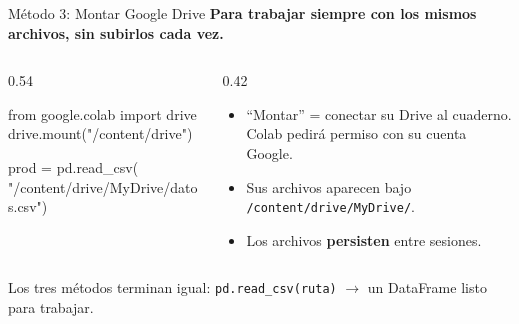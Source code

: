 \documentclass[aspectratio=169, 11pt]{beamer}
\begin{document}
\begin{frame}[fragile,shrink=12]{Método 3: Montar Google Drive}
  \vspace{-4pt}
  {\small\color{arcaDark}\bfseries
    Para trabajar siempre con los mismos archivos, sin subirlos cada vez.}

  \vspace{4pt}
  \begin{columns}[T]
    \begin{column}{0.54\textwidth}
      \begin{pyblock}
from google.colab import drive
drive.mount("/content/drive")

prod = pd.read_csv(
  "/content/drive/MyDrive/datos.csv")
      \end{pyblock}
    \end{column}

    \begin{column}{0.42\textwidth}
      {\scriptsize\color{textMuted}
      \begin{itemize}\setlength{\itemsep}{5pt}
        \item[{\color{arcaRed}\scriptsize\faArrowRight}]
          ``Montar'' = conectar su Drive al cuaderno.
          Colab pedirá permiso con su cuenta Google.
        \item[{\color{arcaRed}\scriptsize\faArrowRight}]
          Sus archivos aparecen bajo
          \texttt{/content/drive/MyDrive/}.
        \item[{\color{codeGreen}\scriptsize\faCheck}]
          Los archivos \textbf{persisten} entre sesiones.
      \end{itemize}
      }
    \end{column}
  \end{columns}

  \vspace{6pt}
  {\footnotesize\color{arcaDark}
    \faLightbulb[regular]\hspace{4pt}%
    Los tres métodos terminan igual: \texttt{pd.read\_csv(ruta)} \(\to\) un DataFrame listo para trabajar.}
\end{frame}
\end{document}
